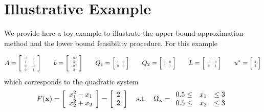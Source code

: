 \section{Illustrative Example} \label{sec:expl}

We provide here a toy example to illustrate the upper bound approximation method and the lower bound feasibility procedure. 
For this example

$$A=
\left[
\scalebox{0.5}{%
	\begin{tabular}{ c c }
	$-1$ & $0$  \\ 
	$1$ & $0$  \\  
	$0$ & $-1$ \\
	$0$ & $1$  
	\end{tabular}%
} 
\right] \hspace*{0.25in} b=
\left[
\scalebox{0.5}{%
	\begin{tabular}{ c }
	$-0.5$  \\ 
	$3$ \\  
	$-0.5$ \\
	$3$  
	\end{tabular}%
} 
\right] \hspace*{0.25in} Q_1=
\left[
\scalebox{0.5}{%
	\begin{tabular}{ c c }
	$1$ & $0$  \\ 
	$0$ & $0$  
	\end{tabular}%
} 
\right] \hspace*{0.25in} Q_2=
\left[
\scalebox{0.5}{%
	\begin{tabular}{ c c }
	$0$ & $0$  \\ 
	$0$ & $1$  
	\end{tabular}%
} 
\right] \hspace*{0.25in} L=
\left[
\scalebox{0.5}{%
	\begin{tabular}{ c c }
	$-1$ & $0$  \\ 
	$0$ & $1$  
	\end{tabular}%
} 
\right] \hspace*{0.25in} u^*=
\left[
\scalebox{0.5}{%
	\begin{tabular}{ c }
	$2$  \\ 
	$2$   
	\end{tabular}%
} 
\right]
$$
which corresponds to the quadratic system 
$$F(\mathbf{x})=\left[\begin{array}{r} x_1^2-x_1 \\ x_2^2+x_2 \end{array}\right]=\left[\begin{array}{r} 2 \\ 2 \end{array}\right] \hspace*{0.15in} \text{s.t.} \hspace*{0.15in} \Omega_{\mathbf{x}}=\begin{array}{rcl} 0.5\leq & x_1 & \leq 3 \\ 0.5\leq & x_2 & \leq 3 \end{array} $$

